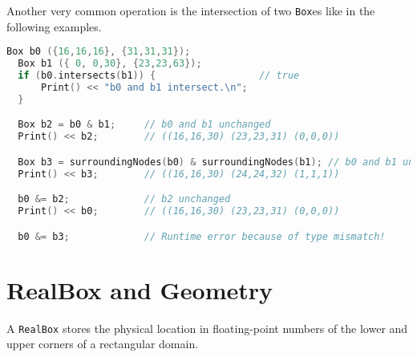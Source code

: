 Another very common operation is the intersection of two {\tt Box}es
like in the following examples.
\begin{lstlisting}[language=cpp]
  Box b0 ({16,16,16}, {31,31,31});
  Box b1 ({ 0, 0,30}, {23,23,63});
  if (b0.intersects(b1)) {                  // true
      Print() << "b0 and b1 intersect.\n"; 
  }

  Box b2 = b0 & b1;     // b0 and b1 unchanged
  Print() << b2;        // ((16,16,30) (23,23,31) (0,0,0))

  Box b3 = surroundingNodes(b0) & surroundingNodes(b1); // b0 and b1 unchanged
  Print() << b3;        // ((16,16,30) (24,24,32) (1,1,1))

  b0 &= b2;             // b2 unchanged
  Print() << b0;        // ((16,16,30) (23,23,31) (0,0,0))

  b0 &= b3;             // Runtime error because of type mismatch!
\end{lstlisting}

\section{RealBox and Geometry}

A {\tt RealBox} stores the physical location in floating-point numbers
of the lower and upper corners of a rectangular domain.

